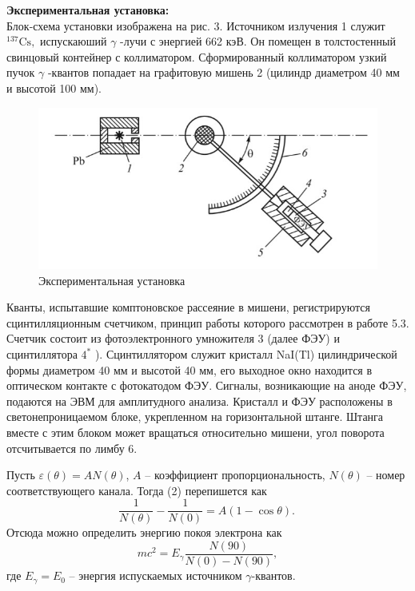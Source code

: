 \documentclass[a4paper, 12pt]{article}%
\begin{document}
	
	\textbf{Экспериментальная установка: }\\
	Блок-схема установки изображена на рис. $3 .$ Источником излучения 1 служит $^{137} \mathrm{Cs},$ испускаюший $\gamma$ -лучи с энергией 662 кэВ. Он помещен в толстостенный свинцовый контейнер с коллиматором. Сформированный коллиматором узкий пучок $\gamma$ -квантов попадает на графитовую мишень 2 (цилиндр диаметром 40 мм и высотой 100 мм).
	
	\begin{figure}[h]
		\begin{center}
			\includegraphics[width = \textwidth]{16.jpg}
			\caption{Экспериментальная установка}
		\end{center}
	\end{figure}
	
	Кванты, испытавшие комптоновское рассеяние в мишени, регистрируются сцинтилляционным счетчиком, принцип работы которого рассмотрен в работе 5.3. Счетчик состоит из фотоэлектронного умножителя 3 (далее ФЭУ) и сцинтиллятора $4^{*}$ ). Сцинтиллятором служит кристалл NaI(Tl) цилиндрической формы диаметром 40 мм и высотой 40 мм, его выходное окно находится в оптическом контакте с фотокатодом ФЭУ. Сигналы, возникающие на аноде ФЭУ, подаются на ЭВМ для амплитудного анализа. Кристалл и ФЭУ расположены в светонепроницаемом блоке, укрепленном на горизонтальной штанге. Штанга вместе с этим блоком может вращаться относительно мишени, угол поворота отсчитывается по лимбу $6 .$
	
	Пусть $\varepsilon(\theta) = AN(\theta)$, $A$ -- коэффициент пропорциональность, $N(\theta)$ -- номер соответствующего канала. Тогда (2) перепишется как
	\begin{equation}
		\dfrac{1}{N(\theta)} - \dfrac{1}{N(0)} = A(1-\cos \theta).\
	\end{equation}
	Отсюда можно определить энергию покоя электрона как 
	\begin{equation}
		mc^2 = E_\gamma \dfrac{N(90)}{N(0) - N(90)},
	\end{equation}
	где $E_\gamma = E_0$ -- энергия испускаемых источником $\gamma$-квантов.
	
\end{document}

